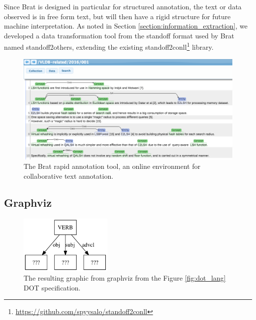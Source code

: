 \documentclass[11pt,a4paper,openright]{memoir}
\begin{document}
Since Brat is designed in particular for structured annotation, the text or data observed is in free form text, but will then have a rigid structure for future machine interpretation. As noted in Section \ref{section:information_extraction}, we developed a data transformation tool from the standoff format used by Brat named standoff2others, extending the existing standoff2conll\footnote{\url{https://github.com/spyysalo/standoff2conll}} library.

\begin{figure}[!htbp]
  \centering
    \includegraphics[width=1.0\textwidth]{./images/brat_img}
  \caption[The Brat rapid annotation tool, an online environment for collaborative text annotation.]{The Brat rapid annotation tool, an online environment for collaborative text annotation.}
  \label{fig:brat_img}
\end{figure}


\subsection{Graphviz}

\begin{figure}[!htbp]
  \centering
    \includegraphics[width=0.4\textwidth]{./images/command-simplified-group-uses-16}
  \caption[The resulting graphic from graphviz.]{The resulting graphic from graphviz from the Figure \ref{fig:dot_lang} DOT specification.}
  \label{fig:dot_img}
\end{figure}
\end{document}
